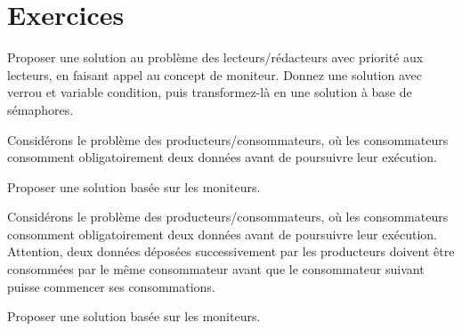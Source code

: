\section{Exercices}

\startexercice

Proposer une solution au problème des lecteurs/rédacteurs avec priorité aux lecteurs, en faisant appel au concept de moniteur. Donnez une solution avec verrou et variable condition, puis transformez-là en une solution à base de sémaphores.

\startexercice

Considérons le problème des producteurs/consommateurs, où les consommateurs consomment obligatoirement deux données avant de poursuivre leur exécution.

Proposer une solution basée sur les moniteurs.

\startexercice

Considérons le problème des producteurs/consommateurs, où les consommateurs consomment obligatoirement deux données avant de poursuivre leur exécution. Attention, deux données déposées successivement par les producteurs doivent être consommées par le même consommateur avant que le consommateur suivant puisse commencer ses consommations.

Proposer une solution basée sur les moniteurs.
